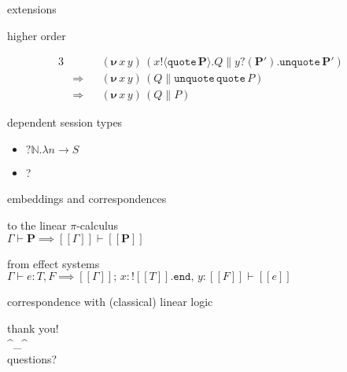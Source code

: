 \documentclass[dvipsnames]{beamer}
\newcommand{\sitem}{\item[\raisebox{.45ex}{\rule{.6ex}{.6ex}}]}
\newcommand{\picalc}{$\pi$-calculus}
\newcommand{\comp}[2]{#1 \parallel #2}
\newcommand{\new}[2]{(\boldsymbol{\nu} \, #1 \, #2) \,}
\newcommand{\send}[2]{#1 !\langle #2 \rangle .}
\newcommand{\recv}[2]{#1 ?( #2 ) .}
\newcommand{\type}[1]{\mathtt{#1}}
\newcommand{\tend}[0]{\type{end}}
\newcommand{\trecv}[1]{\type{?} #1 \type{.}}
\newcommand{\tsend}[1]{\type{!} #1 \type{.}}
\newcommand{\tchan}[1]{\type{C[} #1 \type{]}}
\newcommand{\reducesto}{\Longrightarrow}
\begin{document}
  \begin{frame}{extensions}
    \begin{block}{higher order}
      \begin{fleqn}[0pt]
        \setlength{\abovedisplayskip}{0pt}
        \setlength{\belowdisplayskip}{0pt}
        \begin{alignat*}{3}
          & && \new{x}{y} (\comp {\send{x}{ \mathtt{quote} \, \mathbf{P}} Q} {\recv{y}{\mathbf{P'}}{ \mathtt{unquote} \, \mathbf{P'}}}) & \\
          & \reducesto && \new{x}{y} (\comp{Q}{\mathtt{unquote} \, \mathtt{quote} \, P}) & \\
          & \reducesto && \new{x}{y} (\comp{Q}{P}) &
        \end{alignat*}
      \end{fleqn}
    \end{block}
    \begin{block}{dependent session types}\hfill\\
      \begin{itemize}
        \sitem $\trecv{\mathbb{N}} \lambda n \rightarrow S$
        \sitem \framebox{$\trecv{\tchan{\mathbb{N}}} \lambda n \rightarrow S$}?
      \end{itemize}
    \end{block}
  \end{frame}

  \begin{frame}{embeddings and correspondences}
    \begin{block}{to the linear \picalc{}}\hfill\\
      $\Gamma \vdash \mathbf{P} \implies [\![ \Gamma ]\!] \vdash [\![ \mathbf{P} ]\!]$
    \end{block}

    \begin{block}{from effect systems}\hfill\\
      $\Gamma \vdash e : T , F \implies [\![ \Gamma ]\!]; \, x : \tsend {[\![ T ]\!]} \tend , \, y : [\![ F ]\!] \vdash [\![ e ]\!]$
    \end{block}

    \begin{block}{correspondence with (classical) linear logic}
    \end{block}
  \end{frame}

  \begin{frame}
    \centering
    \Huge{thank you!}\\
    \Huge{\textasciicircum{}\_\textasciicircum{}} \\
    \Huge{questions?}\\
  \end{frame}
\end{document}
